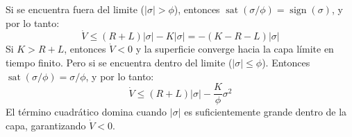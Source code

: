 \begin{enumerate}
\begin{itemize}
        Si se encuentra fuera del limite ($|\sigma|>\phi$), entonces $\operatorname{sat}(\sigma/\phi)=\operatorname{sign}(\sigma)$, y por lo tanto:
        \begin{equation*}
            \dot{V} \le (R+L)|\sigma| - K|\sigma| = -(K-R-L)|\sigma|
        \end{equation*}
        Si $K>R+L$, entonces $\dot{V}<0$ y la superficie converge hacia la capa límite en tiempo finito. Pero si se encuentra dentro del limite ($|\sigma|\le \phi$).  Entonces $\operatorname{sat}(\sigma/\phi)=\sigma/\phi$, y por lo tanto:
        \begin{equation*}
            \dot{V} \le (R+L)|\sigma| - \frac{K}{\phi}\sigma^2
        \end{equation*}
        El término cuadrático domina cuando $|\sigma|$ es suficientemente grande dentro de la capa, garantizando $\dot{V}<0$.  
        
    \end{itemize}
\end{enumerate}